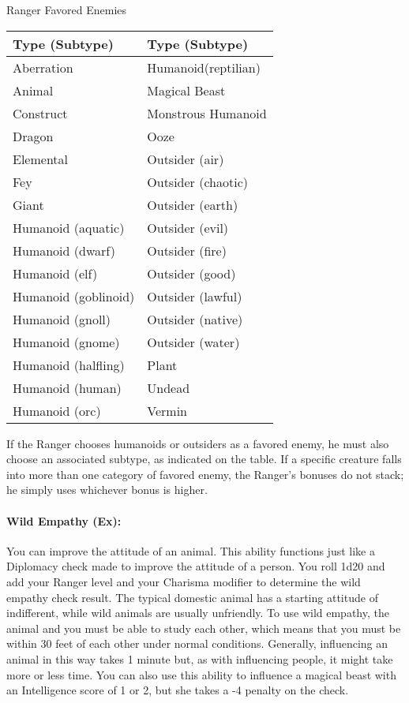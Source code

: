 \begin{tableonecolumn}
\caption{Ranger Favored Enemies}
\label{tab:RangerFE}
\begin{tabular}{ll}
\toprule
Type (Subtype)&Type (Subtype)\\
\midrule
Aberration&Humanoid(reptilian)\\
Animal&Magical Beast\\
Construct&Monstrous Humanoid\\
Dragon&Ooze\\
Elemental&Outsider (air)\\
Fey&Outsider (chaotic)\\
Giant&Outsider (earth)\\
Humanoid (aquatic)&Outsider (evil)\\
Humanoid (dwarf)&Outsider (fire)\\
Humanoid (elf)&Outsider (good)\\
Humanoid (goblinoid)&Outsider (lawful)\\
Humanoid (gnoll)&Outsider (native)\\
Humanoid (gnome)&Outsider (water)\\
Humanoid (halfling)&Plant\\
Humanoid (human)&Undead\\
Humanoid (orc)&Vermin\\
\bottomrule
\end{tabular}
\end{tableonecolumn}

If the Ranger chooses humanoids or outsiders as a favored enemy, he must also choose an associated subtype, as indicated on the table. 
If a specific creature falls into more than one category of favored enemy, the Ranger's bonuses do not stack; he simply uses whichever bonus is higher.

\paragraph[Wild Empathy]{Wild Empathy (Ex):}
\label{sec:WildEmpathy}
You can improve the attitude of an animal.
This ability functions just like a Diplomacy check made to improve the attitude of a person. 
You roll 1d20 and add your Ranger level and your Charisma modifier to determine the wild empathy check result.
The typical domestic animal has a starting attitude of indifferent, while wild animals are usually unfriendly.
To use wild empathy, the animal and you must be able to study each other, 
which means that you must be within 30 feet of each other under normal conditions. 
Generally, influencing an animal in this way takes 1 minute but, as with influencing people, it might take more or less time.
You can also use this ability to influence a magical beast with an Intelligence score of 1 or 2, but she takes a -4 penalty on the check.
